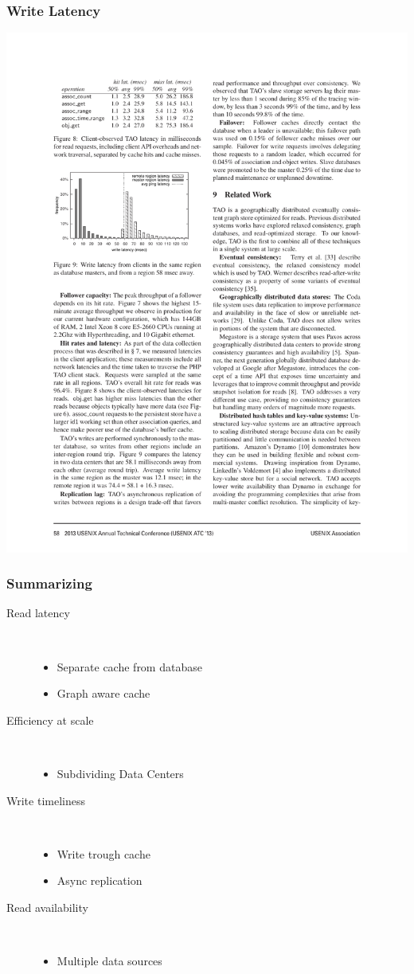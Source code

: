 \begin{frame}[c]\frametitle{Write Latency}
   	\includegraphics[width=\textwidth]{figs/writes.pdf}
\end{frame}


\begin{frame}[c]\frametitle{Summarizing}
\begin{description}
	\item[Read latency] \hfill\\
	\begin{itemize}
		\item Separate cache from database
		\item Graph aware cache
	\end{itemize}
	\item[Efficiency at scale] \hfill\\
	\begin{itemize}
		\item Subdividing Data Centers
	\end{itemize}
	\item[Write timeliness]\hfill\\
	\begin{itemize}
		\item Write trough cache
		\item Async replication
	\end{itemize}
	\item[Read availability]\hfill\\
	\begin{itemize}
		\item Multiple data sources
	\end{itemize}
\end{description}


\end{frame}